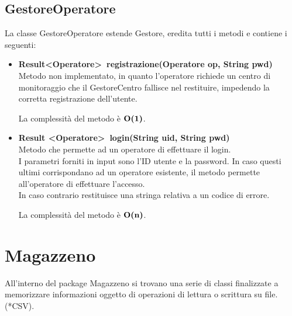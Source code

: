 \documentclass[a4paper, 12pt]{scrreprt}
\begin{document}
			\subsection{GestoreOperatore}
			La classe GestoreOperatore estende Gestore, eredita tutti i metodi e contiene i seguenti:
			\begin{itemize}
				\item \textbf{Result\textless Operatore\textgreater~registrazione(Operatore op, String pwd)}
				\\Metodo non implementato, in quanto l'operatore richiede un centro di monitoraggio che il GestoreCentro fallisce nel restituire, impedendo la corretta registrazione dell'utente.
				
				La complessit\`a del metodo \`e $\mathbf{O}\textbf{(1)}$.
				
				\item \textbf{Result \textless Operatore\textgreater~login(String uid, String pwd)}
				\\Metodo che permette ad un operatore di effettuare il login.
				\\I parametri forniti in input sono l'ID utente e la password. In caso questi ultimi corrispondano ad un operatore esistente, il metodo permette all'operatore di effettuare l'accesso.
				\\In caso contrario restituisce una stringa relativa a un codice di errore.
				
				La complessit\`a del metodo \`e $\mathbf{O}\textbf{(n)}$.
			\end{itemize}


		\section{Magazzeno}
		All'interno del package Magazzeno si trovano una serie di classi finalizzate a memorizzare informazioni oggetto di operazioni di lettura o scrittura su file.(*CSV).
\end{document}
